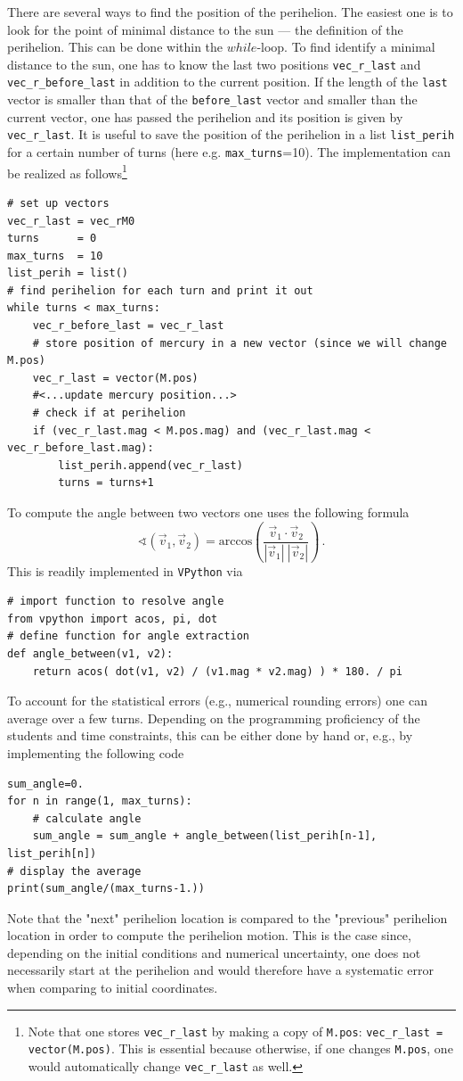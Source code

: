 \documentclass[12pt,ngerman,american]{iopart}
\newcommand{\code}[1]{{\scriptsize\colorbox{light-gray}{\texttt{#1}}}}
\begin{document}
There are several ways to find the position of the perihelion.
The easiest one is to look for the point of minimal distance to the sun --- the definition of the perihelion.
This can be done within the $while$-loop.
To find identify a minimal distance to the sun, one has to know the last two positions \texttt{vec\_r\_last} and \texttt{vec\_r\_before\_last} in addition to the current position.
If the length of the \texttt{last} vector is smaller than that of the \texttt{before\_last} vector and smaller than the current vector, one has passed the perihelion and its position is given by \texttt{vec\_r\_last}.
It is useful to save the position of the perihelion in a list \texttt{list\_perih} for a certain number of turns (here e.g. \texttt{max\_turns}=10).
The implementation can be realized as follows\footnote{%
	Note that one stores \code{vec\_r\_last} by making a copy of \code{M.pos}: \code{vec\_r\_last = vector(M.pos)}.
	This is essential because otherwise, if one changes \code{M.pos}, one would automatically change \code{vec\_r\_last} as well.
}
\begin{lstlisting}
# set up vectors
vec_r_last = vec_rM0
turns      = 0
max_turns  = 10
list_perih = list()
# find perihelion for each turn and print it out
while turns < max_turns:
	vec_r_before_last = vec_r_last
	# store position of mercury in a new vector (since we will change M.pos)
	vec_r_last = vector(M.pos)
	#<...update mercury position...>
	# check if at perihelion
	if (vec_r_last.mag < M.pos.mag) and (vec_r_last.mag < vec_r_before_last.mag):
		list_perih.append(vec_r_last)
		turns = turns+1
\end{lstlisting}
To compute the angle between two vectors one uses the following
formula
 \begin{equation}
 	\sphericalangle(\vec{v}_{1},\vec{v}_2) = \mathrm{arccos} \left( \frac{\vec{v}_{1} \cdot \vec{v}_2}{|\vec{v}_{1}|\:|\vec{v}_2|} \right)
	\, .
 \end{equation}
This is readily implemented in \texttt{VPython} via
\begin{lstlisting}
# import function to resolve angle
from vpython import acos, pi, dot
# define function for angle extraction
def angle_between(v1, v2):
	return acos( dot(v1, v2) / (v1.mag * v2.mag) ) * 180. / pi
\end{lstlisting}
To account for the statistical errors (e.g., numerical rounding errors) one can average over a few turns.
Depending on the programming proficiency of the students and time constraints, this can be either done by hand or, e.g., by implementing the following code
\begin{lstlisting}
sum_angle=0.
for n in range(1, max_turns):
	# calculate angle
	sum_angle = sum_angle + angle_between(list_perih[n-1], list_perih[n])
# display the average
print(sum_angle/(max_turns-1.))
\end{lstlisting}
Note that the "next" perihelion location is compared to the "previous" perihelion location in order to compute the perihelion motion.
This is the case since, depending on the initial conditions and numerical uncertainty, one does not necessarily start at the perihelion and would therefore have a systematic error when comparing to initial coordinates.
\end{document}
